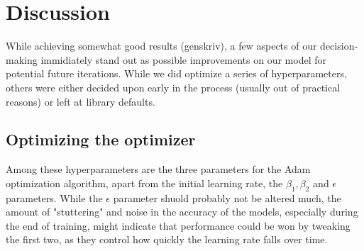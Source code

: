 \section{Discussion}
While achieving somewhat good results (genskriv), a few aspects of our decision-making immidiately stand out as possible improvements on our model for potential future iterations. While we did optimize a series of hyperparameters, others were either decided upon early in the process (usually out of practical reasons) or left at library defaults.
\subsection{Optimizing the optimizer}
Among these hyperparameters are the three parameters for the Adam optimization algorithm, apart from the initial learning rate, the $\beta_1, \beta_2$ and $\epsilon$ parameters. While the $\epsilon$ parameter shuold probably not be altered much, the amount of "stuttering" and noise in the accuracy of the models, especially during the end of training, might indicate that performance could be won by tweaking the first two, as they control how quickly the learning rate falls over time.

